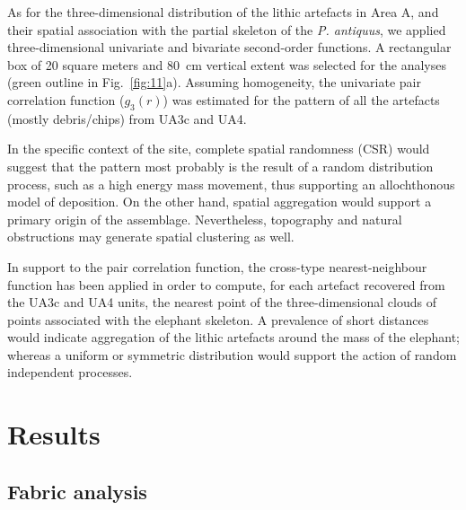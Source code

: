 \documentclass[preprint,authoryear,times]{elsarticle} %
\begin{document}

As for the three-dimensional distribution of the lithic artefacts in Area A, and their spatial association with the partial skeleton of the \emph{P. antiquus}, we applied three-dimensional univariate and bivariate second-order functions. A rectangular box of 20 square meters and 80~cm vertical extent was selected for the analyses (green outline in Fig.~\ref{fig:11}a). Assuming homogeneity, the univariate pair correlation function ($g_3(r)$) was estimated for the pattern of all the artefacts (mostly debris/chips) from UA3c and UA4.

In the specific context of the site, complete spatial randomness (CSR) would suggest that the pattern most probably is the result of a random distribution process, such as a high energy mass movement, thus supporting an allochthonous model of deposition. On the other hand, spatial aggregation would support a primary origin of the assemblage. Nevertheless, topography and natural obstructions may generate spatial clustering as well.

In support to the pair correlation function, the cross-type nearest-neighbour function has been applied in order to compute, for each artefact recovered from the UA3c and UA4 units, the nearest point of the three-dimensional clouds of points associated with the elephant skeleton. A prevalence of short distances would indicate aggregation of the lithic artefacts around the mass of the elephant; whereas a uniform or symmetric distribution would support the action of random independent processes.

\section{Results}

\subsection{Fabric analysis}
\end{document}
